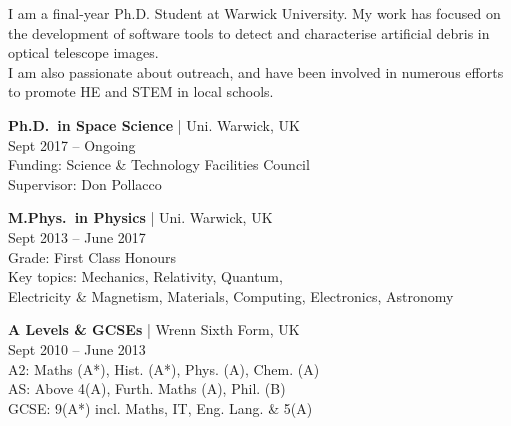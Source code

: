 
\small I am a final-year Ph.D. Student at Warwick University.
My work has focused on the development of software tools to detect and characterise artificial debris in optical telescope images. \\
I am also passionate about outreach, and have been involved in numerous efforts to promote HE and STEM in local schools.

\medskip


\textbf{Ph.D.\ in Space Science} | Uni. Warwick, UK \\ \faCalendar \hspace{2pt} Sept 2017 -- Ongoing \\
\small Funding: Science \& Technology Facilities Council \\
Supervisor: Don Pollacco

\smallskip

\textbf{M.Phys.\ in Physics} | Uni. Warwick, UK \\ \faCalendar \hspace{2pt} Sept 2013 -- June 2017 \\
\small Grade: First Class Honours \\
Key topics: Mechanics, Relativity, Quantum, \\ Electricity \& Magnetism, Materials, Computing, Electronics, Astronomy 

\smallskip

\textbf{A Levels \& GCSEs} | Wrenn Sixth Form, UK \\ \faCalendar \hspace{2pt} Sept 2010 -- June 2013 \\
\small A2: Maths (A*), Hist. (A*), Phys. (A), Chem. (A) \\
AS: Above 4(A), Furth. Maths (A), Phil. (B) \\
GCSE: 9(A*) incl. Maths, IT, Eng. Lang. \& 5(A)

\medskip





